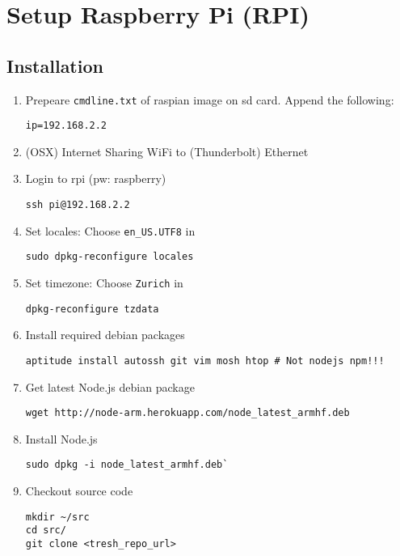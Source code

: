 \section{Setup Raspberry Pi (RPI)}\label{setup-raspberry-pi-rpi}

\subsection*{Installation}\label{installation}

\begin{enumerate}
\def\labelenumi{\arabic{enumi}.}
\item
  Prepeare \texttt{cmdline.txt} of raspian image on sd card. Append the
  following:

\begin{verbatim}
ip=192.168.2.2
\end{verbatim}
\item
  (OSX) Internet Sharing WiFi to (Thunderbolt) Ethernet
\item
  Login to rpi (pw: raspberry)

\begin{verbatim}
ssh pi@192.168.2.2
\end{verbatim}
\item
  Set locales: Choose \texttt{en\_US.UTF8} in

\begin{verbatim}
sudo dpkg-reconfigure locales
\end{verbatim}
\item
  Set timezone: Choose \texttt{Zurich} in

\begin{verbatim}
dpkg-reconfigure tzdata
\end{verbatim}
\item
  Install required debian packages

\begin{verbatim}
aptitude install autossh git vim mosh htop # Not nodejs npm!!!
\end{verbatim}
\item
  Get latest Node.js debian package

\begin{verbatim}
wget http://node-arm.herokuapp.com/node_latest_armhf.deb
\end{verbatim}
\item
  Install Node.js

\begin{verbatim}
sudo dpkg -i node_latest_armhf.deb`
\end{verbatim}
\item
  Checkout source code

\begin{verbatim}
mkdir ~/src
cd src/
git clone <tresh_repo_url>
\end{verbatim}
\end{enumerate}

